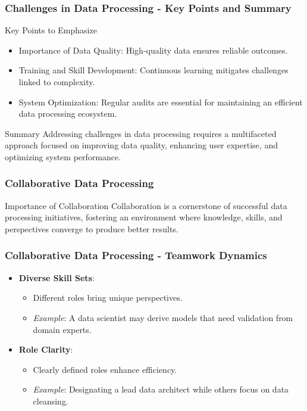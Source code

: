 \documentclass[aspectratio=169]{beamer}
\begin{document}
\begin{frame}[fragile]
    \frametitle{Challenges in Data Processing - Key Points and Summary}
    \begin{block}{Key Points to Emphasize}
        \begin{itemize}
            \item Importance of Data Quality: High-quality data ensures reliable outcomes.
            \item Training and Skill Development: Continuous learning mitigates challenges linked to complexity.
            \item System Optimization: Regular audits are essential for maintaining an efficient data processing ecosystem.
        \end{itemize}
    \end{block}

    \begin{block}{Summary}
        Addressing challenges in data processing requires a multifaceted approach focused on improving data quality, enhancing user expertise, and optimizing system performance.
    \end{block}
\end{frame}

\begin{frame}[fragile]
    \frametitle{Collaborative Data Processing}
    \begin{block}{Importance of Collaboration}
        Collaboration is a cornerstone of successful data processing initiatives, fostering an environment where knowledge, skills, and perspectives converge to produce better results.
    \end{block}
\end{frame}

\begin{frame}[fragile]
    \frametitle{Collaborative Data Processing - Teamwork Dynamics}
    \begin{itemize}
        \item \textbf{Diverse Skill Sets}: 
            \begin{itemize}
                \item Different roles bring unique perspectives.
                \item \textit{Example}: A data scientist may derive models that need validation from domain experts.
            \end{itemize}
        
        \item \textbf{Role Clarity}: 
            \begin{itemize}
                \item Clearly defined roles enhance efficiency. 
                \item \textit{Example}: Designating a lead data architect while others focus on data cleansing.
            \end{itemize}
    \end{itemize}
\end{frame}
\end{document}
